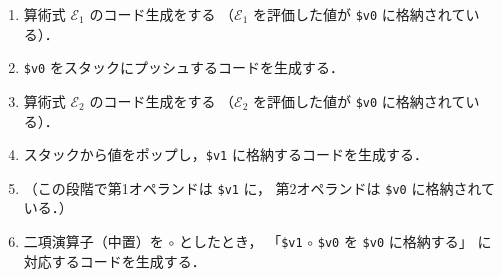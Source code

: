 \documentclass[lualatex, a4paper, ja=standard]{bxjsarticle}
\begin{document}
\begin{enumerate}
  \item 算術式 $\mathcal{E}_1$ のコード生成をする
  （$\mathcal{E}_1$ を評価した値が \verb|$v0| に格納されている）．
  \item \verb|$v0| をスタックにプッシュするコードを生成する．
  \item 算術式 $\mathcal{E}_2$ のコード生成をする
  （$\mathcal{E}_2$ を評価した値が \verb|$v0| に格納されている）．
  \item スタックから値をポップし，\verb|$v1| に格納するコードを生成する．
  \item （この段階で第1オペランドは \verb|$v1| に，
  第2オペランドは \verb|$v0| に格納されている．）
  \item 二項演算子（中置）を $\circ$ としたとき，
  「\verb|$v1| $\circ$ \verb|$v0| を \verb|$v0| に格納する」
  に対応するコードを生成する．
\end{enumerate}
\end{document}
